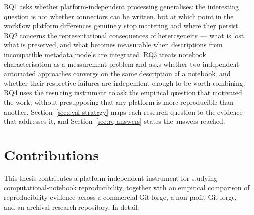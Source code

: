 RQ1 asks whether platform-independent processing generalises: the interesting question is not whether connectors can be written, but at which point in the workflow platform differences genuinely stop mattering and where they persist. RQ2 concerns the representational consequences of heterogeneity --- what is lost, what is preserved, and what becomes measurable when descriptions from incompatible metadata models are integrated. RQ3 treats notebook characterisation as a measurement problem and asks whether two independent automated approaches converge on the same description of a notebook, and whether their respective failures are independent enough to be worth combining. RQ4 uses the resulting instrument to ask the empirical question that motivated the work, without presupposing that any platform is more reproducible than another. Section~\ref{sec:eval-strategy} maps each research question to the evidence that addresses it, and Section~\ref{sec:rq-answers} states the answers reached.

\section{Contributions}
\label{sec:contributions}

This thesis contributes a platform-independent instrument for studying computational-notebook reproducibility, together with an empirical comparison of reproducibility evidence across a commercial Git forge, a non-profit Git forge, and an archival research repository. In detail:

